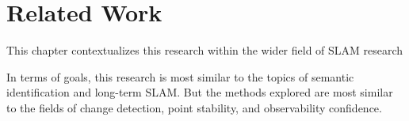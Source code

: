 \section{Related Work}
\label{sec:related_work}

This chapter contextualizes this research within the wider field of SLAM research

In terms of goals, this research is most similar to the topics of semantic identification and long-term SLAM. But the methods explored are most similar to the fields of change detection, point stability, and observability confidence.

% 